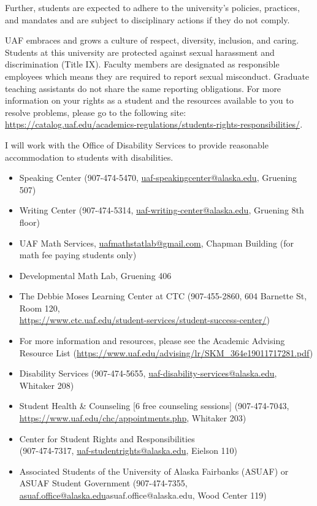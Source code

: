 \documentclass[12pt]{article}
\def\mailto#1{\href{mailto:#1}{#1}}
\begin{document}
Further, students are expected to adhere to the university's policies, practices, and mandates and are subject to disciplinary actions if they do not comply.

 UAF embraces and grows a culture of respect, diversity, inclusion, and caring. Students at this university are protected against sexual harassment and discrimination (Title IX). Faculty members are designated as responsible employees which means they are required to report sexual misconduct. Graduate teaching assistants do not share the same reporting obligations. For more information on your rights as a student and the resources available to you to resolve problems, please go to the following site: \\
\url{https://catalog.uaf.edu/academics-regulations/students-rights-responsibilities/}.

 I will work with the Office of Disability Services to provide reasonable accommodation to students with disabilities.

\begin{itemize}
\setlength\itemsep{0em}
        \item Speaking Center (907-474-5470,
        \mailto{uaf-speakingcenter@alaska.edu}, Gruening 507)
\item Writing Center (907-474-5314, \mailto{uaf-writing-center@alaska.edu}, Gruening 8th floor)
\item UAF Math Services, \mailto{uafmathstatlab@gmail.com}, Chapman Building (for math fee paying students only)
\item Developmental Math Lab, Gruening 406
\item The Debbie Moses Learning Center at CTC (907-455-2860, 604 Barnette St, Room 120,\\ \mailto{https://www.ctc.uaf.edu/student-services/student-success-center/})
\item For more information and resources, please see the Academic Advising Resource List (\url{https://www.uaf.edu/advising/lr/SKM_364e19011717281.pdf})
\end{itemize}

\begin{itemize}
\setlength\itemsep{0em}
\item Disability Services (907-474-5655, \mailto{uaf-disability-services@alaska.edu}, Whitaker 208)
\item Student Health \& Counseling [6 free counseling sessions] (907-474-7043, \url{https://www.uaf.edu/chc/appointments.php}, Whitaker 203)
\item Center for Student Rights and Responsibilities \\(907-474-7317, \mailto{uaf-studentrights@alaska.edu}, Eielson 110)
\item Associated Students of the University of Alaska Fairbanks (ASUAF) or ASUAF Student Government (907-474-7355, \mailto{asuaf.office@alaska.edu}{asuaf.office@alaska.edu}, Wood Center 119)
\end{itemize}
\end{document}
